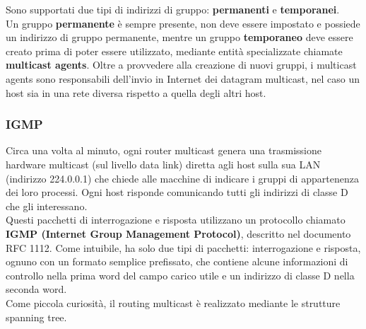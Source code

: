         Sono supportati due tipi di indirizzi di gruppo: \textbf{permanenti} e \textbf{temporanei}.\\
        
        Un gruppo \textbf{permanente} è sempre presente, non deve essere impostato e possiede un indirizzo
        di gruppo permanente, mentre un gruppo \textbf{temporaneo} deve essere creato prima di poter
        essere utilizzato, mediante entità specializzate chiamate \textbf{multicast agents}. Oltre a provvedere
        alla creazione di nuovi gruppi, i multicast agents sono responsabili dell’invio in Internet dei
        datagram multicast, nel caso un host sia in una rete diversa rispetto a quella degli altri host.

        \subsubsection*{IGMP}
            Circa una volta al minuto, ogni router multicast genera una trasmissione hardware multicast
            (sul livello data link) diretta agli host sulla sua LAN (indirizzo 224.0.0.1) che chiede alle
            macchine di indicare i gruppi di appartenenza dei loro processi. Ogni host risponde
            comunicando tutti gli indirizzi di classe D che gli interessano.\\
            
            Questi pacchetti di interrogazione e risposta utilizzano un protocollo chiamato \textbf{IGMP (Internet
            Group Management Protocol)}, descritto nel documento RFC 1112. Come intuibile, ha solo due
            tipi di pacchetti: interrogazione e risposta, ognuno con un formato semplice prefissato, che
            contiene alcune informazioni di controllo nella prima word del campo carico utile e un indirizzo
            di classe D nella seconda word.\\
            
            Come piccola curiosità, il routing multicast è realizzato mediante le strutture spanning tree.
            